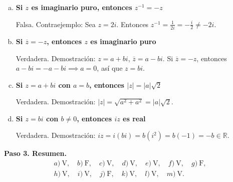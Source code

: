 \begin{prob}
\begin{myproof}
\begin{enumerate}[a)]
\item \textbf{Si $z$ es imaginario puro, entonces $z^{-1}=-z$}

Falsa.  
Contraejemplo: Sea $z=2i$. Entonces $z^{-1} = \frac{1}{2i} = -\frac{i}{2} \neq -2i$.

\item \textbf{Si $\overline{z}=-z$, entonces $z$ es imaginario puro}

Verdadera.  
Demostración: $z=a+bi$, $\overline{z}=a-bi$. Si $\overline{z}=-z$, entonces $a-bi = -a-bi \implies a=0$, así que $z=bi$.

\item \textbf{Si $z=a+bi$ con $a=b$, entonces $|z|=|a|\sqrt{2}$}

Verdadera.  
Demostración: $|z| = \sqrt{a^2 + a^2} = |a|\sqrt{2}$.

\item \textbf{Si $z=bi$ con $b\neq 0$, entonces $iz$ es real}

Verdadera.  
Demostración: $iz = i(bi) = b(i^2) = b(-1) = -b \in \mathbb{R}$.
\end{enumerate}

\textbf{Paso 3. Resumen.}
\[
\boxed{\begin{array}{c}
a)\ \text{V},\quad b)\ \text{F},\quad c)\ \text{V},\quad d)\ \text{V},\quad e)\ \text{V},\quad f)\ \text{V},\quad g)\ \text{F},\\[2pt]
h)\ \text{V},\quad i)\ \text{V},\quad j)\ \text{F},\quad k)\ \text{V},\quad l)\ \text{V},\quad m)\ \text{V}.
\end{array}}
\]
\end{myproof}

\end{prob}

